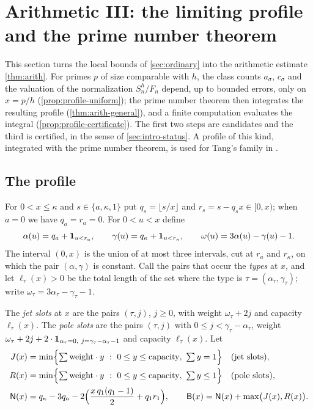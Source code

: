 \section{Arithmetic III: the limiting profile and the prime number theorem}\label{sec:profile}

This section turns the local bounds of \cref{sec:ordinary} into the arithmetic estimate \cref{thm:arith}. For primes $p$ of size comparable with $h$, the class counts $a_\sigma$, $c_\sigma$ and the valuation of the normalization $S_n^h/F_n$ depend, up to bounded errors, only on $x=p/h$ (\cref{prop:profile-uniform}); the prime number theorem then integrates the resulting profile (\cref{thm:arith-general}), and a finite computation evaluates the integral (\cref{prop:profile-certificate}). The first two steps are candidates and the third is certified, in the sense of \cref{sec:intro-status}. A profile of this kind, integrated with the prime number theorem, is used for Tang's family in \cite[Proposition~4.3 and Section~9.10]{Litsey2026Li2}.

\subsection{The profile}\label{sec:profile-definition}
For $0<x\le\kappa$ and $s\in\{a,\kappa,1\}$ put $q_s=\lfloor s/x\rfloor$ and $r_s=s-q_sx\in[0,x)$; when $a=0$ we have $q_a=r_a=0$. For $0<u<x$ define
\[
\alpha(u)=q_a+\mathbf{1}_{u<r_a},\qquad \gamma(u)=q_\kappa+\mathbf{1}_{u<r_\kappa},\qquad \omega(u)=3\alpha(u)-\gamma(u)-1 .
\]
The interval $(0,x)$ is the union of at most three intervals, cut at $r_a$ and $r_\kappa$, on which the pair $(\alpha,\gamma)$ is constant. Call the pairs that occur the \emph{types} at $x$, and let $\ell_\tau(x)>0$ be the total length of the set where the type is $\tau=(\alpha_\tau,\gamma_\tau)$; write $\omega_\tau=3\alpha_\tau-\gamma_\tau-1$.

\begin{definition}\label{def:profile}
The \emph{jet slots} at $x$ are the pairs $(\tau,j)$, $j\ge0$, with weight $\omega_\tau+2j$ and capacity $\ell_\tau(x)$. The \emph{pole slots} are the pairs $(\tau,j)$ with $0\le j<\gamma_\tau-\alpha_\tau$, weight $\omega_\tau+2j+2\cdot\ind_{\alpha_\tau=0,\ j=\gamma_\tau-\alpha_\tau-1}$ and capacity $\ell_\tau(x)$. Let
\begin{align*}
J(x)&=\min\Bigl\{\textstyle\sum\mathrm{weight}\cdot y\ :\ 0\le y\le\mathrm{capacity},\ \sum y=1\Bigr\}\quad\text{(jet slots)},\\
R(x)&=\min\Bigl\{\textstyle\sum\mathrm{weight}\cdot y\ :\ 0\le y\le\mathrm{capacity},\ \sum y\le1\Bigr\}\quad\text{(pole slots)},\\
\mathsf N(x)&=q_\kappa-3q_a-2\Bigl(\frac{x\,q_1(q_1-1)}2+q_1r_1\Bigr),\qquad \mathsf B(x)=\mathsf N(x)+\max\bigl(J(x),R(x)\bigr).
\end{align*}
\end{definition}

